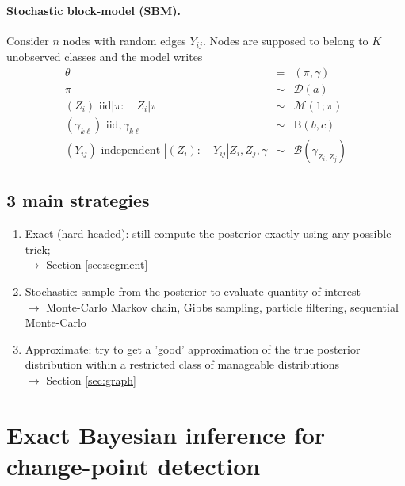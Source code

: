 \documentclass[12pt]{article}
\newcommand{\Mcal}{\mathcal{M}}
\newcommand{\ra}{$\rightarrow$\xspace}
\begin{document}
\paragraph{Stochastic block-model (SBM).} 
Consider $n$ nodes with random edges $Y_{ij}$. Nodes are supposed to belong to $K$ unobserved classes and the model writes
\begin{eqnarray*}
  \theta & = & (\pi, \gamma) \\
  \pi & \sim & \mathcal{D}(a) \\
  (Z_i) \text{ iid} | \pi: \quad Z_i|\pi & \sim & \Mcal(1; \pi) \\
  (\gamma_{k\ell}) \text { iid}, \gamma_{k\ell} & \sim & \text{B}(b, c) \\
  (Y_{ij}) \text{ independent } | (Z_i): \quad Y_{ij}|Z_i, Z_j, \gamma & \sim & \mathcal{B}(\gamma_{Z_i, Z_j})
\end{eqnarray*}


\subsection{3 main strategies}

\begin{enumerate}
 \item Exact (hard-headed): still compute the posterior exactly using any possible trick; \\
 \ra Section \ref{sec:segment}
 \item Stochastic: sample from the posterior to evaluate quantity of interest \\
 \ra Monte-Carlo Markov chain, Gibbs sampling, particle filtering, sequential Monte-Carlo
 \item Approximate: try to get a 'good' approximation of the true posterior distribution within a restricted class of manageable distributions \\
 \ra Section \ref{sec:graph}
\end{enumerate}


\newpage
\section{Exact Bayesian inference for change-point detection  \label{sec:segment}}

\end{document}

